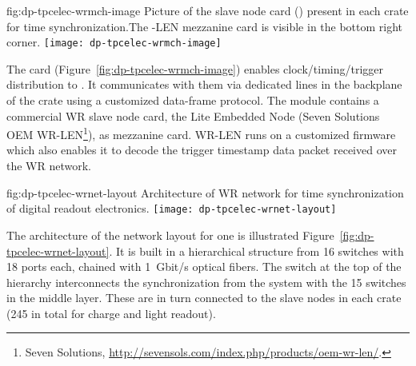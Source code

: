 \begin{dunefigure}{fig:dp-tpcelec-wrmch-image}
{Picture of the  slave node card () present in each  crate for time synchronization.The -LEN mezzanine card is visible in the bottom right corner.}
\texttt{[image: dp-tpcelec-wrmch-image]}
\end{dunefigure}

The  card (Figure~\ref{fig:dp-tpcelec-wrmch-image}) enables clock/timing/trigger distribution to . It communicates with them via dedicated lines in the backplane of the  crate using a customized data-frame protocol. The module contains a commercial WR slave node card, the  Lite Embedded Node (Seven Solutions OEM WR-LEN\footnote{Seven Solutions\texttrademark{}, \url{http://sevensols.com/index.php/products/oem-wr-len/}.}), as mezzanine card. WR-LEN runs on a customized firmware which also enables it to decode the trigger timestamp data packet received over the WR network.

\begin{dunefigure}{fig:dp-tpcelec-wrnet-layout}
{Architecture of WR network for time synchronization of digital readout electronics.}
\texttt{[image: dp-tpcelec-wrnet-layout]}
\end{dunefigure}

The architecture of the  network layout for one  is illustrated Figure~\ref{fig:dp-tpcelec-wrnet-layout}. It is built in a hierarchical structure from \num{16}  switches with \num{18} ports each,  chained with \SI{1}{Gbit/s} optical fibers. The switch at the top of the hierarchy interconnects the synchronization  from the  system with the \num{15} switches in the middle layer. These are in turn connected to the  slave nodes in each  crate (\num{245} in total for charge and light readout). 


